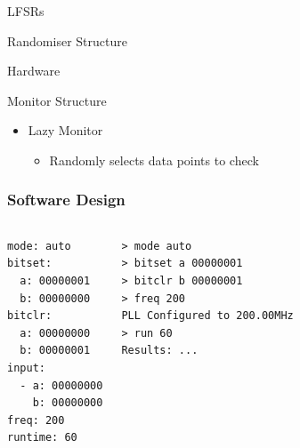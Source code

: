 \documentclass[t]{beamer}
\makeatletter
\newcommand{\verbatimfont}[1]{\renewcommand{\verbatim@font}{\ttfamily#1}}
\makeatother
\begin{document}
\begin{frame}{LFSRs}
  \begin{figure}[H]
    \centering
    
  \end{figure}
  \begin{figure}[H]
    \centering
    
  \end{figure}
\end{frame}

\begin{frame}{Randomiser Structure}
  \begin{figure}[H]
    \centering
    
  \end{figure}
  \begin{figure}[H]
    \centering
    
  \end{figure}
\end{frame}

\begin{frame}{Hardware}
  \begin{figure}[H]
    \centering
    \resizebox{\textwidth}{!}{%
      
    }
  \end{figure}
\end{frame}

\begin{frame}{Monitor Structure}
  \begin{itemize}
    \item Lazy Monitor
    \begin{itemize}
      \item Randomly selects data points to check
    \end{itemize}
  \end{itemize}
  \begin{figure}[H]
    \centering
    \resizebox{0.8\textwidth}{!}{%
      
    }
  \end{figure}
\end{frame}

\begin{frame}[fragile]
  \frametitle{Software Design}
  \begin{columns}
  \verbatimfont{\footnotesize}%
  \begin{verbatim}
mode: auto
bitset:
  a: 00000001
  b: 00000000
bitclr:
  a: 00000000
  b: 00000001
input:
  - a: 00000000
    b: 00000000
freq: 200
runtime: 60
  \end{verbatim}
  \verbatimfont{\footnotesize}%
  \begin{verbatim}
> mode auto
> bitset a 00000001
> bitclr b 00000001
> freq 200
PLL Configured to 200.00MHz
> run 60
Results: ...
  \end{verbatim}
  \end{columns}
\end{frame}
\end{document}
